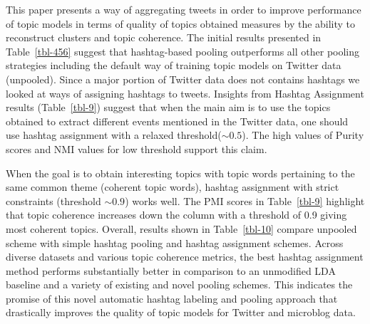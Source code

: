 \documentclass[10pt,a5paper,twoside]{article}
\begin{document}
This paper 
presents a way of aggregating tweets
in order to improve performance of topic models in terms of quality of
topics obtained measures by the ability to reconstruct clusters and
topic coherence. The initial results presented in Table~\ref{tbl-456}
suggest that hashtag-based pooling outperforms all other pooling
strategies including the default way of training topic models on
Twitter data (unpooled). Since a major portion of Twitter data does not contains hashtags we looked at ways of assigning hashtags to tweets. Insights from Hashtag
Assignment results (Table~\ref{tbl-9}) suggest that when the main aim
is to use the topics obtained to extract different events mentioned in
the Twitter data, one should use hashtag assignment with a relaxed
threshold($\sim0.5$). The high values of Purity scores and NMI values for
low threshold support this claim.

When the goal is to obtain interesting topics with topic words
pertaining to the same common theme (coherent topic words), hashtag
assignment with strict constraints (threshold $\sim 0.9$) works
well. The PMI scores in Table~\ref{tbl-9} highlight that topic
coherence increases down the column with a threshold of
0.9 giving most coherent topics. Overall, results shown in Table~\ref{tbl-10} compare unpooled scheme with simple hashtag pooling and hashtag assignment schemes. Across diverse datasets and various topic coherence metrics, the best
hashtag assignment method performs substantially better in comparison
to an unmodified LDA baseline and a variety of existing and novel
pooling schemes.  This indicates the promise of this novel automatic
hashtag labeling and pooling approach that drastically improves the
quality of topic models for Twitter and microblog data.


\end{document}
